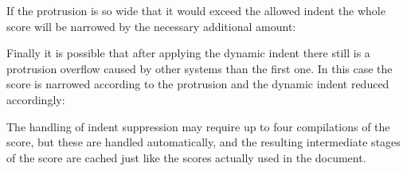 \documentclass{scrartcl}
\begin{document}
If the protrusion is so wide that it would exceed the allowed indent the whole
score will be narrowed by the necessary additional amount:


Finally it is possible that after applying the dynamic indent there still is a
protrusion overflow caused by other systems than the first one.  In this case
the score is narrowed according to the protrusion and the dynamic indent reduced
accordingly:




The handling of indent suppression may require up to four compilations of the
score, but these are handled automatically, and the resulting intermediate
stages of the score are cached just like the scores actually used in the
document.
\end{document}

